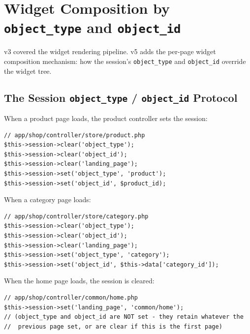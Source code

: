 \documentclass[11pt,a4paper]{article}
\begin{document}
\section{Widget Composition by \texttt{object\_type} and \texttt{object\_id}}\label{sec:widget-composition}

v3 covered the widget rendering pipeline. v5 adds the per-page widget
composition mechanism: how the session's \texttt{object\_type} and
\texttt{object\_id} override the widget tree.

\subsection{The Session \texttt{object\_type} / \texttt{object\_id} Protocol}

When a product page loads, the product controller sets the session:

\begin{lstlisting}[caption={Product page sets session \texttt{object\_type}.},label={lst:product-session}]
// app/shop/controller/store/product.php
$this->session->clear('object_type');
$this->session->clear('object_id');
$this->session->clear('landing_page');
$this->session->set('object_type', 'product');
$this->session->set('object_id', $product_id);
\end{lstlisting}

When a category page loads:

\begin{lstlisting}[caption={Category page sets session \texttt{object\_type}.},label={lst:category-session}]
// app/shop/controller/store/category.php
$this->session->clear('object_type');
$this->session->clear('object_id');
$this->session->clear('landing_page');
$this->session->set('object_type', 'category');
$this->session->set('object_id', $this->data['category_id']);
\end{lstlisting}

When the home page loads, the session is cleared:

\begin{lstlisting}[caption={Home page clears session \texttt{object\_type}.},label={lst:home-session}]
// app/shop/controller/common/home.php
$this->session->set('landing_page', 'common/home');
// (object_type and object_id are NOT set - they retain whatever the
//  previous page set, or are clear if this is the first page)
\end{lstlisting}
\end{document}
